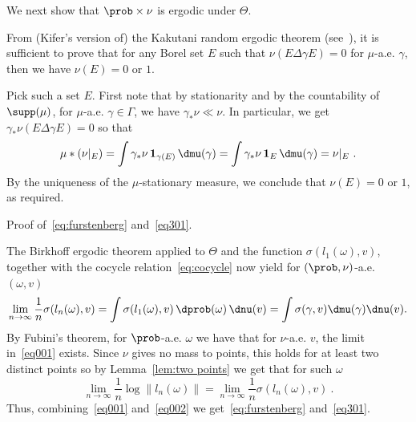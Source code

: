 \begin{step}[Step 2]
We next show that $\prob\times \nu$ is ergodic under $\Theta$.

From (Kifer's version of) the Kakutani random ergodic theorem (see~\cite[Thm.~3.1]{furman}), it is sufficient to prove that for any Borel set $E$ such that $\nu(E\Delta \gamma E)=0$ for $\mu$-a.e. $\gamma$, then we have $\nu(E)=0$ or $1$.

Pick such a set $E$. First note that by stationarity and by the countability of $\supp(\mu)$, for $\mu$-a.e. $\gamma\in \Gamma$, we have $\gamma_*\nu\ll\nu$. In particular, we get $\gamma_*\nu(E\Delta \gamma E)=0$ so that
\[
\mu \ast (\nu|_E) = \int \gamma_*\nu \, \mathbf{1}_{\gamma (E)} \, \dmu(\gamma) = \int \gamma_*\nu \, \mathbf{1}_{E} \, \dmu(\gamma) =\nu|_E~.
\]
By the uniqueness of the $\mu$-stationary measure, we conclude that $\nu(E) =0$ or $1$, as required.
\end{step}

\begin{step}[Step 3]
Proof of~\eqref{eq:furstenberg} and~\eqref{eq301}.

The Birkhoff ergodic theorem applied to $\Theta$ and the function $\sigma(l_1(\omega),v)$, together with the cocycle relation~\eqref{eq:cocycle} now yield for $(\prob,\nu)$-a.e. $(\omega,v)$
\begin{equation}\label{eq001}
\lim_{n\to\infty} \frac1n \sigma(l_n(\omega),v) = \int \sigma (l_1(\omega),v) \, \dprob(\omega)\, \dnu(v) = \int \sigma(\gamma, v) \dmu(\gamma)\dnu(v).
\end{equation}
By Fubini's theorem, for $\prob$-a.e. $\omega$ we have that for $\nu$-a.e. $v$, the limit in~\eqref{eq001} exists. Since $\nu$ gives no mass to points, this holds for at least two distinct points so by Lemma~\ref{lem:two points} we get that for such $\omega$
\begin{equation}\label{eq002}
\lim_{n\to\infty} \frac1n \log \| l_n(\omega)\| = \lim_{n\to\infty} \frac1n \sigma(l_n(\omega),v)~.
\end{equation}
Thus, combining~\eqref{eq001} and~\eqref{eq002} we get~\eqref{eq:furstenberg} and~\eqref{eq301}.
\end{step}

